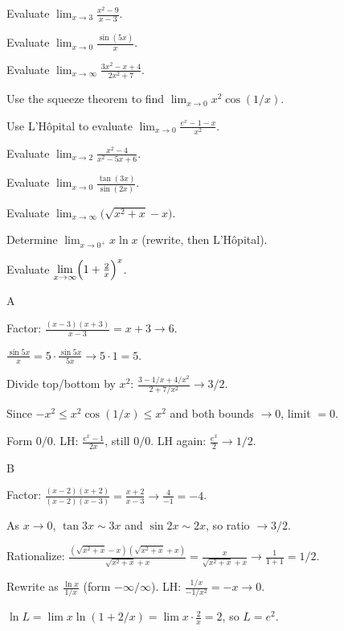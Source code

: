 \documentclass[11pt]{article}
\begin{document}
\begin{problems}
\item Evaluate $\displaystyle \lim_{x\to 3} \frac{x^2 - 9}{x - 3}$.
\item Evaluate $\displaystyle \lim_{x\to 0} \frac{\sin(5x)}{x}$.
\item Evaluate $\displaystyle \lim_{x\to \infty} \frac{3x^2 - x + 4}{2x^2 + 7}$.
\item Use the squeeze theorem to find $\displaystyle \lim_{x\to 0} x^2 \cos(1/x)$.
\item Use L'H\^opital to evaluate $\displaystyle \lim_{x\to 0} \frac{e^x - 1 - x}{x^2}$.
\end{problems}

\vfill
\newpage
{}
\begin{problems}
\item Evaluate $\displaystyle \lim_{x\to 2} \frac{x^2 - 4}{x^2 - 5x + 6}$.
\item Evaluate $\displaystyle \lim_{x\to 0} \frac{\tan(3x)}{\sin(2x)}$.
\item Evaluate $\displaystyle \lim_{x\to \infty} \bigl(\sqrt{x^2 + x} - x\bigr)$.
\item Determine $\displaystyle \lim_{x\to 0^{+}} x \ln x$ (rewrite, then L'H\^opital).
\item Evaluate $\displaystyle \lim_{x\to \infty} \Bigl(1 + \tfrac{2}{x}\Bigr)^x$.
\end{problems}

\vfill
\newpage
{}

\begin{answers}{A}
\item Factor: $\tfrac{(x-3)(x+3)}{x-3} = x+3 \to \boxed{6}$.
\item $\tfrac{\sin 5x}{x} = 5 \cdot \tfrac{\sin 5x}{5x} \to 5 \cdot 1 = \boxed{5}$.
\item Divide top/bottom by $x^2$: $\tfrac{3 - 1/x + 4/x^2}{2 + 7/x^2} \to \boxed{3/2}$.
\item Since $-x^2 \le x^2 \cos(1/x) \le x^2$ and both bounds $\to 0$, limit $= \boxed{0}$.
\item Form $0/0$. LH: $\tfrac{e^x - 1}{2x}$, still $0/0$. LH again: $\tfrac{e^x}{2} \to \boxed{1/2}$.
\end{answers}

\begin{answers}{B}
\item Factor: $\tfrac{(x-2)(x+2)}{(x-2)(x-3)} = \tfrac{x+2}{x-3} \to \tfrac{4}{-1} = \boxed{-4}$.
\item As $x\to 0$, $\tan 3x \sim 3x$ and $\sin 2x \sim 2x$, so ratio $\to \boxed{3/2}$.
\item Rationalize: $\tfrac{(\sqrt{x^2+x}-x)(\sqrt{x^2+x}+x)}{\sqrt{x^2+x}+x} = \tfrac{x}{\sqrt{x^2+x}+x} \to \tfrac{1}{1+1} = \boxed{1/2}$.
\item Rewrite as $\tfrac{\ln x}{1/x}$ (form $-\infty/\infty$). LH: $\tfrac{1/x}{-1/x^2} = -x \to \boxed{0}$.
\item $\ln L = \lim x \ln(1 + 2/x) = \lim x \cdot \tfrac{2}{x} = 2$, so $L = \boxed{e^2}$.
\end{answers}
\end{document}
